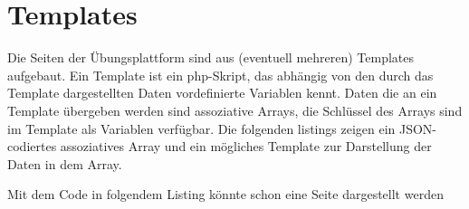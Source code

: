 \section{Templates}
\label{sub:Templates}
Die Seiten der Übungsplattform sind aus (eventuell mehreren) Templates
aufgebaut. Ein Template ist ein php-Skript, das abhängig von den durch das
Template dargestellten Daten vordefinierte Variablen kennt. Daten die an ein
Template übergeben werden sind assoziative Arrays, die Schlüssel des Arrays sind
im Template als Variablen verfügbar. Die folgenden listings zeigen ein
JSON-codiertes assoziatives Array und ein mögliches Template zur Darstellung der
Daten in dem Array.


Mit dem Code in folgendem Listing könnte schon eine Seite dargestellt
werden



